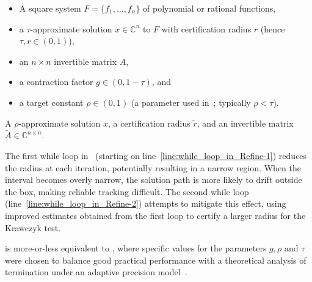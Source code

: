 \documentclass[11pt]{amsart}
\theoremstyle{definition}
\theoremstyle{remark}
\newcommand{\CC}{{\mathbb C}}
\begin{document}
\begin{enumerate}
\begin{algorithm}[ht]
\caption{Refine (cf.~\cite[Algorithm 2]{guillemot2024validated})}
\label{algo:meta_refine}
\begin{algorithmic}[1]
\Require  
\begin{itemize}
    \item A square system $F=\{f_1,\dots, f_n\}$ of polynomial or rational functions,
    \item a $\tau$-approximate solution $x\in \mathbb{C}^n$ to $F$ with certification radius $r$ (hence $\tau , r \in (0,1)$),
    \item an $n\times n$ invertible matrix $A$,
    \item a contraction factor $g \in (0, 1-\tau)$, and
    \item a target constant $\rho\in (0,1)$ (a parameter used in~; typically $\rho < \tau$).
\end{itemize}
\Ensure A $\rho$-approximate solution $x$, a certification radius $\tilde{r}$, and an invertible matrix $\tilde{A} \in \CC^{n\times n}$.
\label{line:while_loop_in_Refine-1}
\Else
{}
\EndIf
{}
\EndWhile
{}\label{line:while_loop_in_Refine-2}
\EndWhile
{}
 \end{algorithmic}
 \end{algorithm}


The first while loop in~ (starting on line~\ref{line:while_loop_in_Refine-1}) reduces the radius at each iteration, potentially resulting in a narrow region. When the interval becomes overly narrow, the solution path is more likely to drift outside the box, making reliable tracking difficult. The second while loop (line~\ref{line:while_loop_in_Refine-2}) attempts to mitigate this effect, using improved estimates obtained from the first loop to certify a larger radius for the Krawczyk test.

 is more-or-less equivalent to \cite[Algorithm 2]{guillemot2024validated}, where specific values for the parameters $g,\rho$ and $\tau$ were chosen to balance good practical performance with a theoretical analysis of termination under an adaptive precision model~\cite[Section 4.2]{guillemot2024validated}. 


\end{enumerate}
\end{document}

